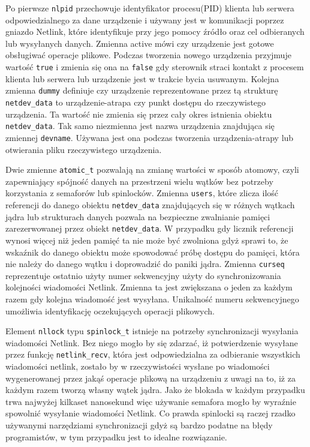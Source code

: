 \documentclass[10pt]{scrartcl}
\begin{document}
Po pierwsze \texttt{nlpid} przechowuje identyfikator procesu(PID) klienta lub serwera odpowiedzialnego za dane urządzenie i używany jest w komunikacji poprzez gniazdo Netlink, które identyfikuje przy jego pomocy źródło oraz cel odbieranych lub wysyłanych danych. Zmienna active mówi czy urządzenie jest gotowe obsługiwać operacje plikowe. Podczas tworzenia nowego urządzenia przyjmuje wartość \texttt{true} i zmienia się ona na \texttt{false} gdy sterownik straci kontakt z procesem klienta lub serwera lub urządzenie jest w trakcie bycia usuwanym.  Kolejna zmienna \texttt{dummy} definiuje czy urządzenie reprezentowane przez tą strukturę \texttt{netdev\_data} to urządzenie-atrapa czy punkt dostępu do rzeczywistego urządzenia. Ta wartość nie zmienia się przez cały okres istnienia obiektu \texttt{netdev\_data}. Tak samo niezmienna jest nazwa urządzenia znajdująca się zmiennej \texttt{devname}. Używana jest ona podczas tworzenia urządzenia-atrapy lub otwierania pliku rzeczywistego urządzenia.

Dwie zmienne \texttt{atomic\_t} pozwalają na zmianę wartości w sposób atomowy, czyli zapewniający spójność danych na przestrzeni wielu wątków bez potrzeby korzystania z semaforów lub spinlocków. Zmienna \texttt{users}, które zlicza ilość referencji do danego obiektu \texttt{netdev\_data} znajdujących się w różnych wątkach jądra lub strukturach danych pozwala na bezpieczne zwalnianie pamięci zarezerwowanej przez obiekt \texttt{netdev\_data}. W przypadku gdy licznik referencji wynosi więcej niż jeden pamięć ta nie może być zwolniona gdyż sprawi to, że wskaźnik do danego obiektu może spowodować próbę dostępu do pamięci, która nie należy do danego wątku i doprowadzić do paniki jądra. Zmienna \texttt{curseq} reprezentuje ostatnio użyty numer sekwencyjny użyty do synchronizowania kolejności wiadomości Netlink. Zmienna ta jest zwiększana o jeden za każdym razem gdy kolejna wiadomość jest wysyłana. Unikalność numeru sekwencyjnego umożliwia identyfikację oczekujących operacji plikowych.

Element \texttt{nllock} typu \texttt{spinlock\_t} istnieje na potrzeby synchronizacji wysyłania wiadomości Netlink. Bez niego mogło by się zdarzać, iż potwierdzenie wysyłane przez funkcję \texttt{netlink\_recv}, która jest odpowiedzialna za odbieranie wszystkich wiadomości netlink, zostało by w rzeczywistości wysłane po wiadomości wygenerowanej przez jakąś operacje plikową na urządzeniu z uwagi na to, iż za każdym razem tworzą własny wątek jądra. Jako że blokada w każdym przypadku trwa najwyżej kilkaset nanosekund więc używanie semafora mogło by wyraźnie spowolnić wysyłanie wiadomości Netlink. Co prawda spinlocki są raczej rzadko używanymi narzędziami synchronizacji gdyż są bardzo podatne na błędy programistów, w tym przypadku jest to idealne rozwiązanie.
\end{document}
